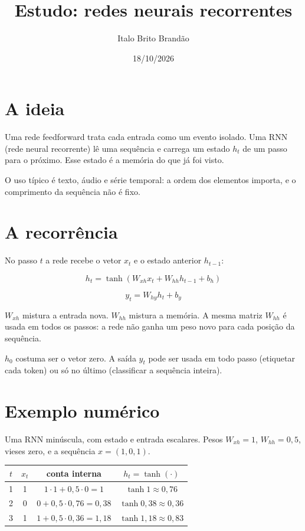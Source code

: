 \documentclass[11pt]{article}
\title{Estudo: redes neurais recorrentes}
\author{Italo Brito Brandão}
\date{18/10/2026}
\begin{document}
\maketitle

\section{A ideia}

Uma rede feedforward trata cada entrada como um evento isolado. Uma RNN (rede neural recorrente) lê uma sequência e carrega um estado \(h_t\) de um passo para o próximo. Esse estado é a memória do que já foi visto.

O uso típico é texto, áudio e série temporal: a ordem dos elementos importa, e o comprimento da sequência não é fixo.

\section{A recorrência}

No passo \(t\) a rede recebe o vetor \(x_t\) e o estado anterior \(h_{t-1}\):

\begin{equation}
  h_t = \tanh(W_{xh} x_t + W_{hh} h_{t-1} + b_h)
  \label{eq:rnn}
\end{equation}

\begin{equation}
  y_t = W_{hy} h_t + b_y
\end{equation}

\(W_{xh}\) mistura a entrada nova. \(W_{hh}\) mistura a memória. A mesma matriz \(W_{hh}\) é usada em todos os passos: a rede não ganha um peso novo para cada posição da sequência.

\(h_0\) costuma ser o vetor zero. A saída \(y_t\) pode ser usada em todo passo (etiquetar cada token) ou só no último (classificar a sequência inteira).

\section{Exemplo numérico}

Uma RNN minúscula, com estado e entrada escalares. Pesos \(W_{xh} = 1\), \(W_{hh} = 0{,}5\), vieses zero, e a sequência \(x = (1, 0, 1)\).

\begin{center}
\begin{tabular}{cccc}
  \toprule
  \(t\) & \(x_t\) & conta interna & \(h_t = \tanh(\cdot)\) \\
  \midrule
  1 & 1 & \(1\cdot 1 + 0{,}5\cdot 0 = 1\) & \(\tanh 1 \approx 0{,}76\) \\
  2 & 0 & \(0 + 0{,}5\cdot 0{,}76 = 0{,}38\) & \(\tanh 0{,}38 \approx 0{,}36\) \\
  3 & 1 & \(1 + 0{,}5\cdot 0{,}36 = 1{,}18\) & \(\tanh 1{,}18 \approx 0{,}83\) \\
  \bottomrule
\end{tabular}
\end{center}
\end{document}
